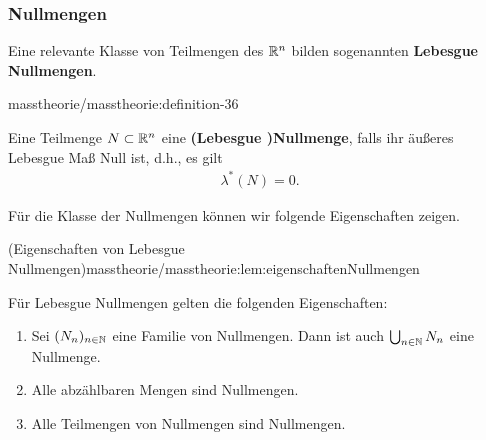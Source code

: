 \subsubsection{Nullmengen}
\label{\detokenize{masstheorie/masstheorie:nullmengen}}
\par
Eine relevante Klasse von Teilmengen des \(\mathbb{R}^n\) bilden sogenannten \textbf{Lebesgue Nullmengen}.
\begin{definition}{}{masstheorie/masstheorie:definition-36}



\par
Eine Teilmenge \(N \subset \mathbb{R}^n\) eine \textbf{(Lebesgue )Nullmenge}, falls ihr äußeres Lebesgue Maß Null ist, d.h., es gilt
\begin{align*}
\lambda^*(N) = 0.
\end{align*}\end{definition}

\par
Für die Klasse der Nullmengen können wir folgende Eigenschaften zeigen.
\begin{lemma}{(Eigenschaften von Lebesgue Nullmengen)}{masstheorie/masstheorie:lem:eigenschaftenNullmengen}



\par
Für Lebesgue Nullmengen gelten die folgenden Eigenschaften:
\begin{enumerate}

\item {} 
\par
Sei \((N_n)_{n\in\mathbb{N}}\) eine Familie von Nullmengen.
Dann ist auch \(\bigcup_{n\in\mathbb{N}} N_n\) eine Nullmenge.

\item {} 
\par
Alle abzählbaren Mengen sind Nullmengen.

\item {} 
\par
Alle Teilmengen von Nullmengen sind Nullmengen.

\end{enumerate}
\end{lemma}

